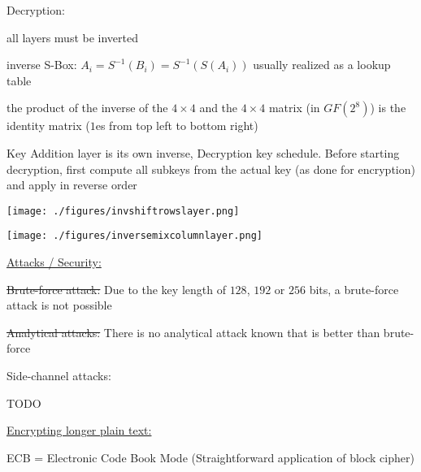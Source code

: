 \documentclass[landscape, a4paper]{article}
\begin{document}
\begin{minipage}[t]{0.198\pagewidth}
	\begin{betterlist}
		\item \alert{Decryption:}
		\begin{betterlist}
			\item all layers must be inverted
			\item inverse S-Box: $A_i = S^{-1}(B_i) = S^{-1}(S(A_i))$ usually realized as a lookup table
			\item the product of the inverse of the $4\times 4$ and the $4\times 4$ matrix (in $GF(2^8)$) is the identity matrix ($1$es from top left to bottom right)
			\item Key Addition layer is its own inverse, Decryption key schedule. Before starting decryption, first compute all subkeys from the
			actual key (as done for encryption) and apply in reverse order
		\end{betterlist}
		\begin{minipage}[b]{0.5\linewidth}
			\texttt{[image: ./figures/invshiftrowslayer.png]}
		\end{minipage}
		\begin{minipage}[b]{0.5\linewidth}
			\texttt{[image: ./figures/inversemixcolumnlayer.png]}
		\end{minipage}
		\item \underline{Attacks / Security:}
		\begin{betterlist}
			\item \sout{Brute-force attack:} Due to the key length of $128$, $192$ or $256$ bits, a brute-force attack is not possible
			\item \sout{Analytical attacks:} There is no analytical attack known that is better than brute-force
			\item \alert{Side-channel attacks:}
			\begin{betterlist}
				\item TODO
			\end{betterlist}
		\end{betterlist}
	\end{betterlist}
	\begin{betterlist}
		\item \underline{Encrypting longer plain text:}
		\begin{betterlist}
			\item \alert{ECB} = Electronic Code Book Mode (Straightforward application of block cipher)
			\begin{betterlist}

\end{betterlist}
\end{betterlist}
\end{betterlist}
\end{minipage}
\end{document}
